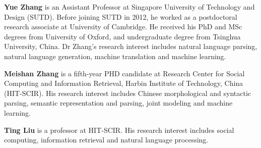 \begin{bio}
{\bfseries Yue Zhang} is an Assistant Professor at Singapore University of Technology and Design (SUTD). Before joining SUTD in 2012, he worked as a postdoctoral research associate at University of Cambridge. He received his PhD and MSc degrees from University of Oxford, and undergraduate degree from Tsinghua University, China. Dr Zhang’s research interest includes natural language parsing, natural language generation, machine translation and machine learning.

{\bfseries Meishan Zhang} is a fifth-year PHD candidate at Research Center for Social Computing and Information Retrieval, Harbin Institute of Technology, China (HIT-SCIR). His research interest includes Chinese morphological and syntactic parsing, semantic representation and parsing, joint modeling and machine learning.

{\bfseries Ting Liu} is a professor at HIT-SCIR. His research interest includes
social computing, information retrieval and natural language
processing.
\end{bio}

